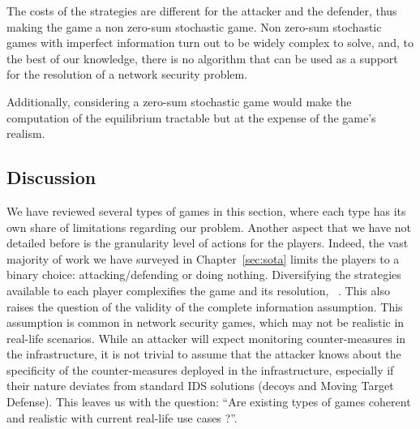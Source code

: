 The costs of the strategies are different for the attacker and the defender, thus making the game a non zero-sum stochastic game. Non zero-sum stochastic games with imperfect information turn out to be widely complex to solve, and, to the best of our knowledge, there is no algorithm that can be used as a support for the resolution of a network security problem. 

Additionally, considering a zero-sum stochastic game would make the computation of the equilibrium tractable but at the expense of the game's realism.


\subsection{Discussion}
We have reviewed several types of games in this section, where each type has its own share of limitations regarding our problem. Another aspect that we have not detailed before is the granularity level of actions for the players. Indeed, the vast majority of work we have surveyed in Chapter~\ref{sec:sota} limits the players to a binary choice: attacking/defending or doing nothing. Diversifying the strategies available to each player complexifies the game and its resolution, ~\cite{Kiennert2018}.
This also raises the question of the validity of the complete information assumption.
This assumption is common in network security games, which may not be realistic in real-life scenarios.
While an attacker will expect monitoring counter-measures in the infrastructure, it is not trivial to assume that the attacker knows about the specificity of the counter-measures deployed in the infrastructure, especially if their nature deviates from standard IDS solutions (\eg decoys and Moving Target Defense).
This leaves us with the question: ``Are existing types of games coherent and realistic with current real-life use cases ?''.


